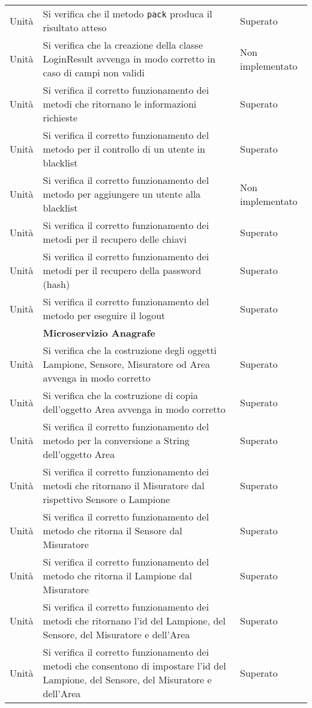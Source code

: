 \begin{center}
\begin{xltabular}{\linewidth}{|l|X|l|}
        Unità & Si verifica che il metodo \texttt{pack} produca il risultato atteso & Superato\\
        Unità & Si verifica che la creazione della classe LoginResult avvenga in modo corretto in caso di campi non validi & Non implementato\\
        Unità & Si verifica il corretto funzionamento dei metodi che ritornano le informazioni richieste & Superato\\
        Unità & Si verifica il corretto funzionamento del metodo per il controllo di un utente in blacklist & Superato\\
        Unità & Si verifica il corretto funzionamento del metodo per aggiungere un utente alla blacklist & Non implementato\\
        Unità & Si verifica il corretto funzionamento dei metodi per il recupero delle chiavi & Superato\\
        Unità & Si verifica il corretto funzionamento dei metodi per il recupero della password (hash) & Superato\\
        Unità & Si verifica il corretto funzionamento del metodo per eseguire il logout & Superato\\
        & \textbf{Microservizio Anagrafe} &\\
        Unità & Si verifica che la costruzione degli oggetti Lampione, Sensore, Misuratore od Area avvenga in modo corretto & Superato\\
        Unità & Si verifica che la costruzione di copia dell'oggetto Area avvenga in modo corretto & Superato\\
        Unità & Si verifica il corretto funzionamento del metodo per la conversione a String dell'oggetto Area & Superato\\
        Unità & Si verifica il corretto funzionamento dei metodi che ritornano il Misuratore dal rispettivo Sensore o Lampione & Superato\\
        Unità & Si verifica il corretto funzionamento del metodo che ritorna il Sensore dal Misuratore & Superato\\
        Unità & Si verifica il corretto funzionamento del metodo che ritorna il Lampione dal Misuratore & Superato\\
        Unità & Si verifica il corretto funzionamento dei metodi che ritornano l'id del Lampione, del Sensore, del Misuratore e dell'Area & Superato\\
        Unità & Si verifica il corretto funzionamento dei metodi che consentono di impostare l'id del Lampione, del Sensore, del Misuratore e dell'Area & Superato\\

\end{xltabular}
\end{center}
